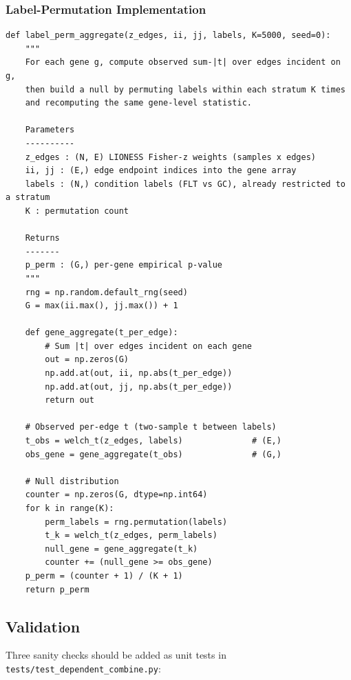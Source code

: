 \documentclass[11pt]{article}
\newcommand{\code}[1]{\texttt{#1}}
\begin{document}
\subsubsection{Label-Permutation Implementation}

\begin{lstlisting}[style=pythonstyle,caption={Label-permutation aggregation, vectorized over genes.}]
def label_perm_aggregate(z_edges, ii, jj, labels, K=5000, seed=0):
    """
    For each gene g, compute observed sum-|t| over edges incident on g,
    then build a null by permuting labels within each stratum K times
    and recomputing the same gene-level statistic.

    Parameters
    ----------
    z_edges : (N, E) LIONESS Fisher-z weights (samples x edges)
    ii, jj : (E,) edge endpoint indices into the gene array
    labels : (N,) condition labels (FLT vs GC), already restricted to a stratum
    K : permutation count

    Returns
    -------
    p_perm : (G,) per-gene empirical p-value
    """
    rng = np.random.default_rng(seed)
    G = max(ii.max(), jj.max()) + 1

    def gene_aggregate(t_per_edge):
        # Sum |t| over edges incident on each gene
        out = np.zeros(G)
        np.add.at(out, ii, np.abs(t_per_edge))
        np.add.at(out, jj, np.abs(t_per_edge))
        return out

    # Observed per-edge t (two-sample t between labels)
    t_obs = welch_t(z_edges, labels)              # (E,)
    obs_gene = gene_aggregate(t_obs)              # (G,)

    # Null distribution
    counter = np.zeros(G, dtype=np.int64)
    for k in range(K):
        perm_labels = rng.permutation(labels)
        t_k = welch_t(z_edges, perm_labels)
        null_gene = gene_aggregate(t_k)
        counter += (null_gene >= obs_gene)
    p_perm = (counter + 1) / (K + 1)
    return p_perm
\end{lstlisting}

\subsection{Validation}

Three sanity checks should be added as unit tests in \code{tests/test\_dependent\_combine.py}:
\end{document}
